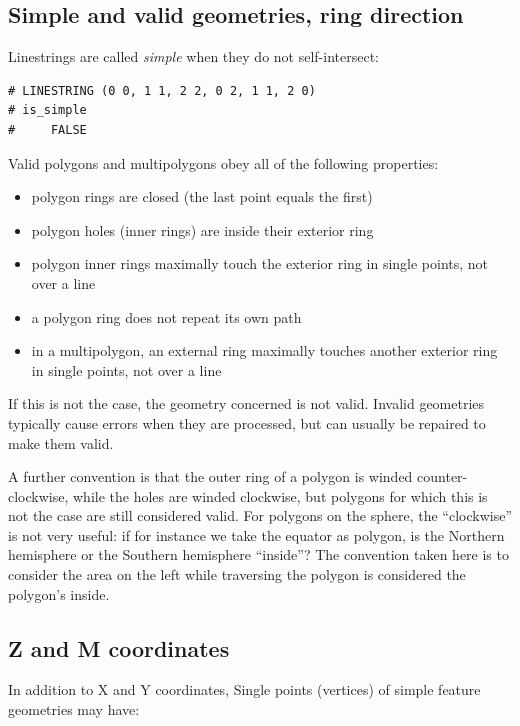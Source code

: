 \documentclass[]{book}
\providecommand{\tightlist}{%
  \setlength{\itemsep}{0pt}\setlength{\parskip}{0pt}}
\begin{document}
\hypertarget{valid}{%
\subsection{Simple and valid geometries, ring direction}\label{valid}}

Linestrings are called \emph{simple} when they do not self-intersect:

\begin{verbatim}
# LINESTRING (0 0, 1 1, 2 2, 0 2, 1 1, 2 0)
# is_simple 
#     FALSE
\end{verbatim}

Valid polygons and multipolygons obey all of the following properties:

\begin{itemize}
\tightlist
\item
  polygon rings are closed (the last point equals the first)
\item
  polygon holes (inner rings) are inside their exterior ring
\item
  polygon inner rings maximally touch the exterior ring in single points, not over a line
\item
  a polygon ring does not repeat its own path
\item
  in a multipolygon, an external ring maximally touches another exterior ring in single points, not over a line
\end{itemize}

If this is not the case, the geometry concerned is not valid. Invalid
geometries typically cause errors when they are processed, but can
usually be repaired to make them valid.

A further convention is that the outer ring of a polygon is winded
counter-clockwise, while the holes are winded clockwise, but polygons
for which this is not the case are still considered valid. For polygons
on the sphere, the ``clockwise'' is not very useful: if for instance we take
the equator as polygon, is the Northern hemisphere or the Southern hemisphere
``inside''? The convention taken here is to consider the area on the left while
traversing the polygon is considered the polygon's inside.

\hypertarget{z-and-m-coordinates}{%
\subsection{Z and M coordinates}\label{z-and-m-coordinates}}

In addition to X and Y coordinates, Single points (vertices) of
simple feature geometries may have:
\end{document}
